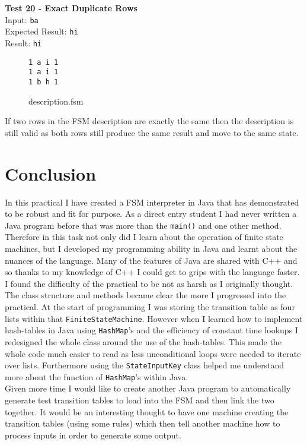 \documentclass{article}
\begin{document}
\noindent \\ \\ \textbf{Test 20 - Exact Duplicate Rows} \\
\noindent Input: \verb+ba+ \\
Expected Result: \verb+hi+ \\
Result: \verb+hi+ \\
\begin{figure}[H]
\center
\begin{BVerbatim}
1 a i 1
1 a i 1
1 b h 1
\end{BVerbatim}
\caption{description.fsm}
\end{figure}
\noindent If two rows in the FSM description are exactly the same then the description is still valid as both rows still produce the same result and move to the same state.

\section{Conclusion}
In this practical I have created a FSM interpreter in Java that has demonstrated to be robust and fit for purpose. As a direct entry student I had never written a Java program before that was more than the \verb+main()+ and one other method. Therefore in this task not only did I learn about the operation of finite state machines, but I developed my programming ability in Java and learnt about the nuances of the language. Many of the features of Java are shared with C++ and so thanks to my knowledge of C++ I could get to grips with the language faster. \\

\noindent I found the difficulty of the practical to be not as harsh as I originally thought. The class structure and methods became clear the more I progressed into the practical. At the start of programming I was storing the transition table as four lists within that \verb+FiniteStateMachine+. However when I learned how to implement hash-tables in Java using \verb+HashMap+'s and the efficiency of constant time lookups I redesigned the whole class around the use of the hash-tables. This made the whole code much easier to read as less unconditional loops were needed to iterate over lists. Furthermore using the \verb+StateInputKey+ class helped me understand more about the function of \verb+HashMap+'s within Java. \\

\noindent Given more time I would like to create another Java program to automatically generate test transition tables to load into the FSM and then link the two together. It would be an interesting thought to have one machine creating the transition tables (using some rules) which then tell another machine how to process inputs in order to generate some output.
\end{document}
